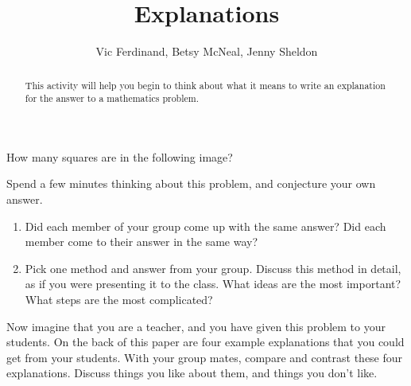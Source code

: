 \documentclass[nooutcomes]{ximera}
\title{Explanations}
\author{Vic Ferdinand, Betsy McNeal, Jenny Sheldon}
\begin{document}
\begin{abstract} 
This activity will help you begin to think about what it means to write an explanation for the answer to a mathematics problem. 
\end{abstract}
\maketitle


 How many squares are in the following image?
\begin{center}
\end{center}


\begin{problem} 
Spend a few minutes thinking about this problem, and conjecture your own answer.  
\begin{enumerate}
\item Did each member of your group come up with the same answer?  Did each member come to their answer in the same way?



\item
Pick one method and answer from your group.  Discuss this method in detail, as if you were presenting it to the class.  What ideas are the most important?  What steps are the most complicated?

\end{enumerate}
\end{problem}

\begin{problem} 
Now imagine that you are a teacher, and you have given this problem to your students.  On the back of this paper are four example explanations that you could get from your students.  With your group mates, compare and contrast these four explanations.  Discuss things you like about them, and things you don't like.
\end{problem}
\newpage
\end{document}
